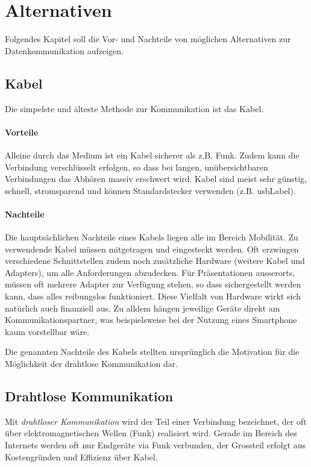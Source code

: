 \chapter{Alternativen}
\label{ch:alt}
Folgendes Kapitel soll die Vor- und Nachteile von möglichen Alternativen zur Datenkommunikation aufzeigen.

\section{Kabel}
Die simpelste und älteste Methode zur Kommunikation ist das Kabel.

\subsubsection{Vorteile}
Alleine durch das Medium ist ein Kabel sicherer als z.B. Funk. Zudem kann die Verbindung verschlüsselt erfolgen, so dass bei langen, unübersichtbaren Verbindungen das Abhören massiv erschwert wird. Kabel sind meist sehr günstig, schnell, stromsparend und können Standardstecker verwenden (z.B. \gls{usbLabel}).

\subsubsection{Nachteile}
Die hauptsächlichen Nachteile eines Kabels liegen alle im Bereich Mobilität.
Zu verwendende Kabel müssen mitgetragen und eingesteckt werden.
Oft erzwingen verschiedene Schnittstellen zudem noch zusätzliche Hardware (weitere Kabel und Adapters), um alle Anforderungen abzudecken.
Für Präsentationen ausserorts, müssen oft mehrere Adapter zur Verfügung stehen, so dass sichergestellt werden kann, dass alles reibungslos funktioniert.
Diese Vielfalt von Hardware wirkt sich natürlich auch finanziell aus. Zu alldem hängen jeweilige Geräte direkt am Kommunikationspartner, was beispielsweise bei der Nutzung eines Smartphone kaum vorstellbar wäre.

Die genannten Nachteile des Kabels stellten ursprünglich die Motivation für die Möglichkeit der drahtlose Kommunikation dar.

\section{Drahtlose Kommunikation}

Mit \textit{drahtloser Kommunikation} wird der Teil einer Verbindung bezeichnet, der oft über elektromagnetischen Wellen (Funk) realisiert wird.
Gerade im Bereich des Internets werden oft nur Endgeräte via Funk verbunden, der Grossteil erfolgt aus Kostengründen und Effizienz über Kabel.

